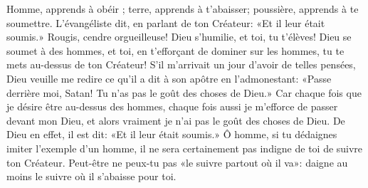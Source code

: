 Homme, apprends à obéir ; terre, apprends à t'abaisser;
	poussière, apprends à te soumettre.
L'évangéliste dit, en parlant de ton Créateur: «Et il leur était soumis.»
Rougis, cendre orgueilleuse! Dieu s'humilie, et toi, tu t'élèves!	 
	Dieu se soumet à des hommes, et toi, en t'efforçant de dominer sur les hommes,
	tu te mets au-dessus de ton Créateur!
S'il m'arrivait un jour d'avoir de telles pensées,
	Dieu veuille me redire ce qu'il a dit à son apôtre en l'admonestant:
	«Passe derrière moi, Satan! Tu n'as pas le goût des choses de Dieu.»
Car chaque fois que je désire être au-dessus des hommes,
	chaque fois aussi je m'efforce de passer devant mon Dieu,
	et alors vraiment je n'ai pas le goût des choses de Dieu.
De Dieu en effet, il est dit:
	«Et il leur était soumis.»
Ô homme, si tu dédaignes imiter l'exemple d'un homme,
	il ne sera certainement pas indigne de toi de suivre ton Créateur.	 
Peut-être ne peux-tu pas «le suivre partout où il va»:
	daigne au moins le suivre où il s'abaisse pour toi.
